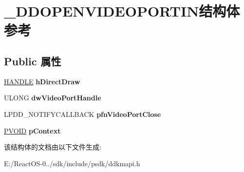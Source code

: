 \hypertarget{struct___d_d_o_p_e_n_v_i_d_e_o_p_o_r_t_i_n}{}\section{\+\_\+\+D\+D\+O\+P\+E\+N\+V\+I\+D\+E\+O\+P\+O\+R\+T\+I\+N结构体 参考}
\label{struct___d_d_o_p_e_n_v_i_d_e_o_p_o_r_t_i_n}
\subsection*{Public 属性}
\begin{DoxyCompactItemize}
\item 
\mbox{\label{struct___d_d_o_p_e_n_v_i_d_e_o_p_o_r_t_i_n_aa6384799491c989e4a7a27a73f7c28b5}} 
\hyperlink{interfacevoid}{H\+A\+N\+D\+LE} {\bfseries h\+Direct\+Draw}
\item 
\mbox{\label{struct___d_d_o_p_e_n_v_i_d_e_o_p_o_r_t_i_n_acd53bbafab832c4625b562739a85fd5d}} 
U\+L\+O\+NG {\bfseries dw\+Video\+Port\+Handle}
\item 
\mbox{\label{struct___d_d_o_p_e_n_v_i_d_e_o_p_o_r_t_i_n_a65c6c4bd8013efccbf23dc7b7fc3bc3d}} 
L\+P\+D\+D\+\_\+\+N\+O\+T\+I\+F\+Y\+C\+A\+L\+L\+B\+A\+CK {\bfseries pfn\+Video\+Port\+Close}
\item 
\mbox{\label{struct___d_d_o_p_e_n_v_i_d_e_o_p_o_r_t_i_n_a1738fa3f2a4baf427f5e900362b9d1ad}} 
\hyperlink{interfacevoid}{P\+V\+O\+ID} {\bfseries p\+Context}
\end{DoxyCompactItemize}


该结构体的文档由以下文件生成\+:\begin{DoxyCompactItemize}
\item 
E\+:/\+React\+O\+S-\/0../sdk/include/psdk/ddkmapi.\+h\end{DoxyCompactItemize}
